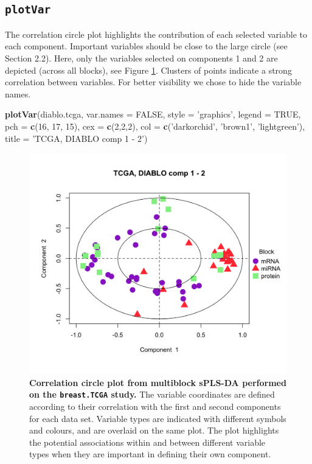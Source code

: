 \documentclass[]{book}
\newenvironment{Shaded}{\begin{snugshade}}{\end{snugshade}}
\newcommand{\KeywordTok}[1]{\textcolor[rgb]{0.13,0.29,0.53}{\textbf{#1}}}
\newcommand{\DataTypeTok}[1]{\textcolor[rgb]{0.13,0.29,0.53}{#1}}
\newcommand{\DecValTok}[1]{\textcolor[rgb]{0.00,0.00,0.81}{#1}}
\newcommand{\StringTok}[1]{\textcolor[rgb]{0.31,0.60,0.02}{#1}}
\newcommand{\OtherTok}[1]{\textcolor[rgb]{0.56,0.35,0.01}{#1}}
\newcommand{\NormalTok}[1]{#1}
\begin{document}
\subsection{\texorpdfstring{\texttt{plotVar}}{plotVar}}\label{plotvar}

The correlation circle plot highlights the contribution of each selected
variable to each component. Important variables should be close to the
large circle (see Section 2.2). Here, only the variables selected on
components 1 and 2 are depicted (across all blocks), see Figure
\ref{fig:diablo-plotvar}. Clusters of points indicate a strong
correlation between variables. For better visibility we chose to hide
the variable names.

\begin{Shaded}
\begin{Highlighting}[]
\KeywordTok{plotVar}\NormalTok{(diablo.tcga, }\DataTypeTok{var.names =} \OtherTok{FALSE}\NormalTok{, }\DataTypeTok{style =} \StringTok{'graphics'}\NormalTok{, }\DataTypeTok{legend =} \OtherTok{TRUE}\NormalTok{, }
        \DataTypeTok{pch =} \KeywordTok{c}\NormalTok{(}\DecValTok{16}\NormalTok{, }\DecValTok{17}\NormalTok{, }\DecValTok{15}\NormalTok{), }\DataTypeTok{cex =} \KeywordTok{c}\NormalTok{(}\DecValTok{2}\NormalTok{,}\DecValTok{2}\NormalTok{,}\DecValTok{2}\NormalTok{), }
        \DataTypeTok{col =} \KeywordTok{c}\NormalTok{(}\StringTok{'darkorchid'}\NormalTok{, }\StringTok{'brown1'}\NormalTok{, }\StringTok{'lightgreen'}\NormalTok{),}
        \DataTypeTok{title =} \StringTok{'TCGA, DIABLO comp 1 - 2'}\NormalTok{)}
\end{Highlighting}
\end{Shaded}

\begin{figure}

{\centering \includegraphics[width=0.5\linewidth]{Figures/DIABLO/diablo-plotvar-1} 

}

\caption{\textbf{Correlation circle plot from multiblock
sPLS-DA performed on the \texttt{breast.TCGA} study.} The variable
coordinates are defined according to their correlation with the first
and second components for each data set. Variable types are indicated
with different symbols and colours, and are overlaid on the same plot.
The plot highlights the potential associations within and between
different variable types when they are important in defining their own
component.}\label{fig:diablo-plotvar}
\end{figure}
\end{document}
